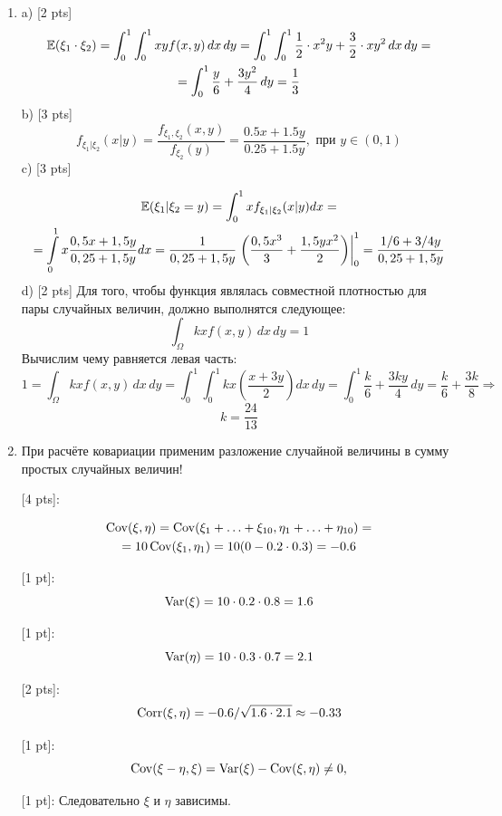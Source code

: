 \documentclass[12pt, a4paper]{article}\usepackage[]{graphicx}\usepackage[]{color}
\begin{document}
\begin{enumerate}

\item
a) [2 pts]
\begin{multline}
\mathbb{E}({\xi_1 \cdot \xi_2}) = \int_{0}^1 \int_0^1 xy f(x,y) \, dx \, dy = \int_0^1 \int_0^1 \frac{1}{2}\cdot x^2y + \frac{3}{2}\cdot xy^2 \, dx \, dy =\\
=  \int_{0}^1 \frac{y}{6} + \frac{3y^2}{4} \,dy = \frac{1}{3}
\nonumber\end{multline}
b) [3 pts]
\[
f_{\xi_1 | \xi_2} (x | y) = \frac{f_{\xi_1, \xi_2}(x, y)}{f_{\xi_2}(y)} = \frac{0.5x + 1.5y}{0.25 + 1.5y}, \text{ при } y \in (0,1)
\]
c) [3 pts]

\begin{multline}
\mathbb{E}(\xi_1 | \xi_2 = y) = \int_0^1 x f_{\xi_1 | \xi_2} (x | y) dx = \\
= \int\limits_{0}^{1}  x \dfrac{0,5x + 1,5y}{0,25 + 1,5y} dx = \dfrac{1}{0,25 + 1,5y}  \left. \left( \dfrac{0,5x^3}{3} +  \dfrac{1,5yx^2}{2} \right) \right|_0^1  =  \dfrac{1/6 + 3/4y}{0,25 + 1,5y}
\end{multline}
d) [2 pts]
Для того, чтобы функция являлась совместной плотностью для пары случайных величин, должно выполнятся следующее:
\[
\int_{\Omega} kx f(x,y) \, dx \, dy = 1
\]
Вычислим чему равняется левая часть:
\[
1 = \int_{\Omega} kx f(x,y) \, dx \, dy = \int_{0}^1 \int_{0}^1 kx \left(\frac{x + 3y}{2}\right) dx \, dy = \int_{0}^1 \frac{k}{6} + \frac{3ky}{4} \, dy = \frac{k}{6} + \frac{3k}{8} \Rightarrow
\]
\[
k = \frac{24}{13}
\]
\item При расчёте ковариации применим разложение случайной величины в сумму простых случайных величин!

[4 pts]:

\begin{multline}
\operatorname{Cov}(\xi, \eta) = \operatorname{Cov}(\xi_1 + \ldots + \xi_{10}, \eta_1 + \ldots + \eta_{10})=\\
=10\operatorname{Cov}(\xi_1, \eta_1)=10(0-0.2\cdot 0.3)=-0.6
\nonumber\end{multline}



[1 pt]:
\[
\operatorname{Var}(\xi)=10\cdot 0.2\cdot 0.8=1.6
\]

[1 pt]:
\[
\operatorname{Var}(\eta)=10\cdot 0.3\cdot 0.7=2.1
\]

[2 pts]:
\[
\operatorname{Corr}(\xi,\eta)=-0.6/\sqrt{1.6\cdot 2.1} \approx -0.33
\]

[1 pt]:
\[
\operatorname{Cov}(\xi - \eta, \xi) = \operatorname{Var}(\xi) - \operatorname{Cov}(\xi, \eta) \neq 0,
\]


[1 pt]:
Следовательно $\xi$ и $\eta$ зависимы.


\end{enumerate}
\end{document}
